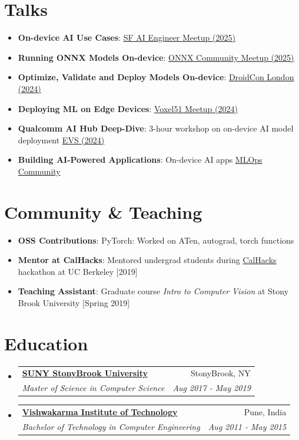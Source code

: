\documentclass[letterpaper,11pt]{article}
\makeatletter
\newcommand{\resumeItem}[2]{
  \item\small{
    \textbf{#1}{: #2 \vspace{-2pt}}
  }
}
\newcommand{\resumeSubheading}[4]{
  \vspace{-1pt}\item
    \begin{tabular*}{0.97\textwidth}{l@{\extracolsep{\fill}}r}
      \textbf{#1} & #2 \\
      \textit{\small#3} & \textit{\small #4} \\
    \end{tabular*}\vspace{-5pt}
}
\newcommand{\resumeSubItem}[2]{\resumeItem{#1}{#2}\vspace{2pt}}
\newcommand{\resumeSubHeadingListStart}{\begin{itemize}[leftmargin=*]}
\newcommand{\resumeSubHeadingListEnd}{\end{itemize}}
\newcommand{\resumeItemListStart}{\begin{itemize}}
\newcommand{\resumeItemListEnd}{\end{itemize}\vspace{-5pt}}
\makeatother
\begin{document}
\section{Talks}
\resumeSubHeadingListStart
    \resumeSubItem{On-device AI Use Cases}{\href{https://youtu.be/xWFb4UqcLos?list=PLMsoJacBGVm9x645OnK00bEOlI8DE48Ev&t=856}{SF AI Engineer Meetup (2025)}}
    \resumeSubItem{Running ONNX Models On-device}{\href{https://www.youtube.com/watch?v=mVSLkN5Vec0&list=PLNqLlwTfo321Fk5SuWmWhjtTVAgdAYxH6&index=16}{ONNX Community Meetup (2025)}}
    \resumeSubItem{Optimize, Validate and Deploy Models On-device}{\href{https://www.youtube.com/watch?v=F_sdswYSjoM}{DroidCon London (2024)}}
    \resumeSubItem{Deploying ML on Edge Devices}{\href{https://voxel51.com/blog/recapping-the-ai-machine-learning-and-computer-meetup-november-14-2024}{Voxel51 Meetup (2024)}}
    \resumeSubItem{Qualcomm AI Hub Deep-Dive}{3-hour workshop on on-device AI model deployment \href{https://embeddedvisionsummit.com/2024-deep-dive-session-qualcomm/}{EVS (2024)}}
    \resumeSubItem{Building AI-Powered Applications}{On-device AI apps \href{https://lu.ma/vizhe6w2}{MLOps Community}}
\resumeSubHeadingListEnd

\section{Community \& Teaching}
\resumeSubHeadingListStart
\resumeSubItem{OSS Contributions}{PyTorch: Worked on ATen, autograd, torch functions}
\resumeSubItem{Mentor at CalHacks}{Mentored undergrad students during \href{https://calhacks.io/}{CalHacks} hackathon at UC Berkeley [2019]}
\resumeSubItem{Teaching Assistant}{Graduate course \textit{Intro to Computer Vision} at Stony Brook University [Spring 2019]}

\resumeSubHeadingListEnd


\section{Education}
  \resumeSubHeadingListStart
    \resumeSubheading
      {\href{http://www.stonybrook.edu/}{SUNY StonyBrook University}}{StonyBrook, NY}
      {Master of Science in Computer Science}{Aug 2017 - May 2019}
    \resumeSubheading
      {\href{http://vit.edu/}{Vishwakarma Institute of Technology}}{Pune, India}
      {Bachelor of Technology in Computer Engineering}{Aug 2011 - May 2015}
  \resumeSubHeadingListEnd
  
\end{document}
